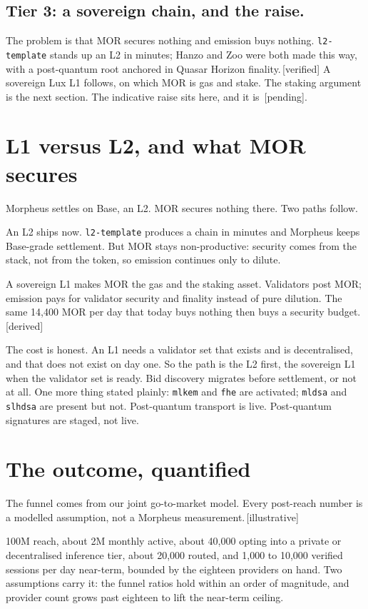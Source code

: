\documentclass[11pt,a4paper]{article}
\newcommand{\code}[1]{\texttt{\small #1}}
\newcommand{\lab}[1]{{\color{muted}\footnotesize\,[#1]}}
\begin{document}
\subsection*{Tier 3: a sovereign chain, and the raise.}

The problem is that MOR secures nothing and emission buys nothing.
\code{l2-template} stands up an L2 in minutes; Hanzo and Zoo were both made this
way, with a post-quantum root anchored in Quasar Horizon finality.\lab{verified}
A sovereign Lux L1 follows, on which MOR is gas and stake. The staking argument
is the next section. The indicative raise sits here, and it is \lab{pending}.

\section*{L1 versus L2, and what MOR secures}

Morpheus settles on Base, an L2. MOR secures nothing there. Two paths follow.

An L2 ships now. \code{l2-template} produces a chain in minutes and Morpheus
keeps Base-grade settlement. But MOR stays non-productive: security comes from
the stack, not from the token, so emission continues only to dilute.

A sovereign L1 makes MOR the gas and the staking asset. Validators post MOR;
emission pays for validator security and finality instead of pure dilution. The
same 14{,}400 MOR per day that today buys nothing then buys a security
budget.\lab{derived}

The cost is honest. An L1 needs a validator set that exists and is decentralised,
and that does not exist on day one. So the path is the L2 first, the sovereign L1
when the validator set is ready. Bid discovery migrates before settlement, or not
at all. One more thing stated plainly: \code{mlkem} and \code{fhe} are activated;
\code{mldsa} and \code{slhdsa} are present but not. Post-quantum transport is
live. Post-quantum signatures are staged, not live.

\section*{The outcome, quantified}

The funnel comes from our joint go-to-market model. Every post-reach number is a
modelled assumption, not a Morpheus measurement.\lab{illustrative}

100M reach, about 2M monthly active, about 40{,}000 opting into a private or
decentralised inference tier, about 20{,}000 routed, and 1{,}000 to 10{,}000
verified sessions per day near-term, bounded by the eighteen providers on hand.
Two assumptions carry it: the funnel ratios hold within an order of magnitude,
and provider count grows past eighteen to lift the near-term ceiling.
\end{document}
